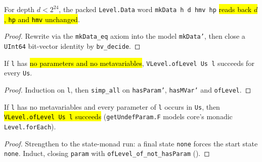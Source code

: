 \begin{lemma}
\label{fam:lvl-mkdata}
\leanok
{}

 For depth $d < 2^{24}$, the packed \texttt{Level.Data} word \texttt{mkData h d hmv hp}
\hl{reads back $d$, \texttt{hp} and \texttt{hmv} unchanged}.
\end{lemma}
\begin{proof}
\leanok
{} Rewrite via the \texttt{mkData\_eq} axiom into the model \texttt{mkData'}, then close a
\texttt{UInt64} bit-vector identity by \texttt{bv\_decide}.
\end{proof}

\begin{theorem}
\label{thm:lvl-oflevel-of-not-hasparam}
\leanok
{}
 If \texttt{l} has \hl{no parameters and no metavariables}, \texttt{VLevel.ofLevel Us l}
succeeds for every \texttt{Us}.
\end{theorem}
\begin{proof}
\leanok
{} Induction on \texttt{l}, then \texttt{simp\_all} on \texttt{hasParam'}, \texttt{hasMVar'}
and \texttt{ofLevel}.
\end{proof}

\begin{theorem}
\label{thm:lvl-getundefparam-none}
\leanok
{}
 If \texttt{l} has no metavariables and every parameter of \texttt{l} occurs in
\texttt{Us}, then \hl{\texttt{VLevel.ofLevel Us l} succeeds} (\texttt{getUndefParam.F} models core's
monadic \texttt{Level.forEach}).
\end{theorem}
\begin{proof}
\leanok
{} Strengthen to the state-monad run: a final state \texttt{none} forces the start state
\texttt{none}. Induct, closing \texttt{param} with \texttt{ofLevel\_of\_not\_hasParam}
().
\end{proof}

